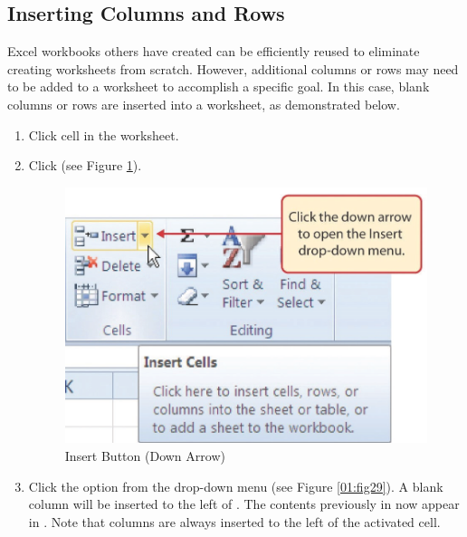 \subsection{Inserting Columns and Rows}

Excel workbooks others have created can be efficiently reused to eliminate creating worksheets from scratch. However, additional columns or rows may need to be added to a worksheet to accomplish a specific goal. In this case, blank columns or rows are inserted into a worksheet, as demonstrated below.

\begin{enumbox}
	\begin{enumerate}
		\item Click cell  in the  worksheet.
		\item Click  (see Figure \ref{01:fig28}).
	
		\begin{figure}[H]
			\centering
			\includegraphics[width=\maxwidth{.95\linewidth}]{gfx/ch01_fig28}
			\caption{Insert Button (Down Arrow)}
			\label{01:fig28}
		\end{figure}

		\item Click the  option from the drop-down menu (see Figure \ref{01:fig29}). A blank column will be inserted to the left of . The contents previously in  now appear in . Note that columns are always inserted to the left of the activated cell.
	\end{enumerate}
\end{enumbox}


